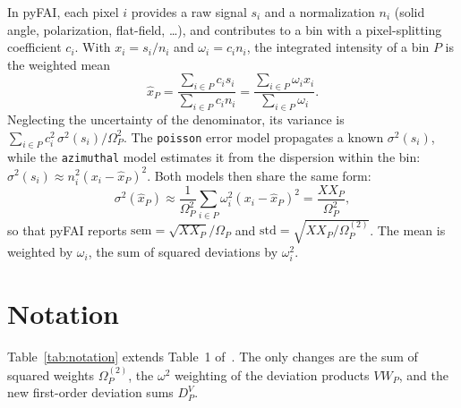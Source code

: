 \documentclass[a4paper,11pt]{article}
\newcommand{\mean}[1]{\widehat{#1}}
\newcommand{\Om}{\Omega}
\newcommand{\OmS}{\Omega^{(2)}}
\newcommand{\D}[2]{D^{#1}_{#2}}
\begin{document}
In pyFAI, each pixel $i$ provides a raw signal $s_i$ and a normalization $n_i$ (solid angle,
polarization, flat-field, \dots), and contributes to a bin with a pixel-splitting coefficient $c_i$.
With $x_i = s_i/n_i$ and $\omega_i = c_i n_i$, the integrated intensity of a bin $P$ is the weighted mean
\begin{equation}
  \mean{x}_P = \frac{\sum_{i\in P} c_i s_i}{\sum_{i\in P} c_i n_i}
             = \frac{\sum_{i\in P}\omega_i x_i}{\sum_{i\in P}\omega_i}.
\end{equation}
Neglecting the uncertainty of the denominator, its variance is
$\sum_{i\in P} c_i^2\,\sigma^2(s_i) \big/ \Om_P^2$.
The \texttt{poisson} error model propagates a known $\sigma^2(s_i)$, while the \texttt{azimuthal}
model estimates it from the dispersion within the bin: $\sigma^2(s_i)\approx n_i^2(x_i-\mean{x}_P)^2$.
Both models then share the same form:
\begin{equation}
  \sigma^2(\mean{x}_P) \approx \frac{1}{\Om_P^2}\sum_{i\in P}\omega_i^2 (x_i-\mean{x}_P)^2 = \frac{XX_P}{\Om_P^2},
\end{equation}
so that pyFAI reports $\mathrm{sem}=\sqrt{XX_P}/\Om_P$ and $\mathrm{std}=\sqrt{XX_P/\OmS_P}$.
The mean is weighted by $\omega_i$, the sum of squared deviations by $\omega_i^2$.

\section{Notation}
\label{sec:notation}

Table~\ref{tab:notation} extends Table~1 of~\cite{SG18}. The only changes are the sum of squared
weights $\OmS_P$, the $\omega^2$ weighting of the deviation products $VW_P$, and the new first-order
deviation sums $\D{V}{P}$.
\end{document}
